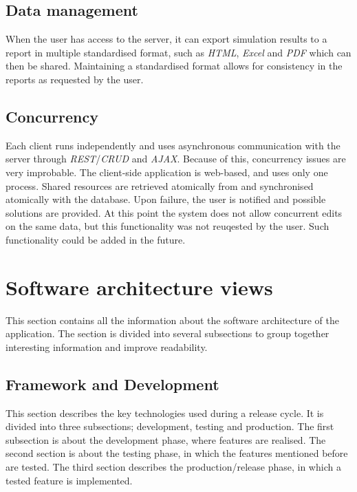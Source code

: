\documentclass{report}
\begin{document}
		\subsection{Data management}
			When the user has access to the server, it can export simulation results to a report in multiple standardised format, such as \emph{HTML}, \emph{Excel} and \emph{PDF} which can then be shared. Maintaining a standardised format allows for consistency in the reports as requested by the user.		
	
		\subsection{Concurrency}
			Each client runs independently and uses asynchronous communication with the server through \emph{REST}/\emph{CRUD} and \emph{AJAX}. Because of this, concurrency issues are very improbable. The client-side application is web-based, and uses only one process. Shared resources are retrieved atomically from and synchronised atomically with the database. Upon failure, the user is notified and possible solutions are provided. At this point the system does not allow concurrent edits on the same data, but this functionality was not reuqested by the user. Such functionality could be added in the future.\\		
			
	\clearpage
	\section{Software architecture views}
		This section contains all the information about the software architecture of the application. The section is divided into several subsections to group together interesting information and improve readability.	
		
		\subsection{Framework and Development}
			This section describes the key technologies used during a release cycle.
			It is divided into three subsections; development, testing and production.
			The first subsection is about the development phase, where features are realised.
			The second section is about the testing phase, in which the features mentioned before are tested.
			The third section describes the production/release phase, in which a tested feature is implemented.
			
\end{document}
